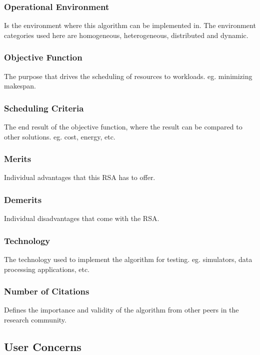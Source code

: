 \documentclass[fullapage,12pt]{article}
\begin{document}
\subsubsection*{Operational Environment} Is the environment where this algorithm can be implemented in. The environment categories used here are homogeneous, heterogeneous, distributed and dynamic.

\subsubsection*{Objective Function} The purpose that drives the scheduling of resources to workloads. eg. minimizing makespan.

\subsubsection*{Scheduling Criteria} The end result of the objective function, where the result can be compared to other solutions. eg. cost, energy, etc.

\subsubsection*{Merits} Individual advantages that this RSA has to offer.

\subsubsection*{Demerits} Individual disadvantages that come with the RSA.

\subsubsection*{Technology} The technology used to implement the algorithm for testing. eg. simulators, data processing applications, etc.

\subsubsection*{Number of Citations} Defines the importance and validity of the algorithm from other peers in the research community.




\subsection{User Concerns}
\end{document}

